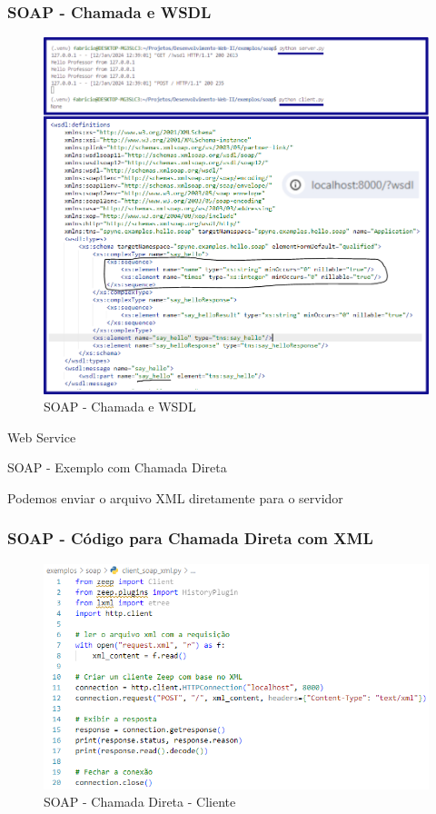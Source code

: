 \documentclass[
	10pt, %
	t, %
]{beamer}
\begin{document}
\begin{frame}[fragile]
	\frametitle{SOAP - Chamada e WSDL}
	
	\begin{figure}
		\includegraphics[width=0.7\linewidth]{soap_example.png}
		\caption{SOAP - Chamada e WSDL}
		\label{fig:soap_example}
	\end{figure}

\end{frame}

\begin{frame}
	\begin{center}
		
		\bigskip\bigskip\bigskip\bigskip %
		{\Large Web Service}
		
		\bigskip\bigskip %
		{\Huge SOAP - Exemplo com Chamada Direta}
		
		\smallskip
		{\small Podemos enviar o arquivo XML diretamente para o servidor}
	\end{center}

\end{frame}

\begin{frame}[fragile]
	\frametitle{SOAP - Código para Chamada Direta com XML}
	
	\begin{figure}
		\includegraphics[width=0.7\linewidth]{client_xml.PNG}
		\caption{SOAP - Chamada Direta - Cliente}
		\label{fig:soap_client_xml}
	\end{figure}

\end{frame}
\end{document}

